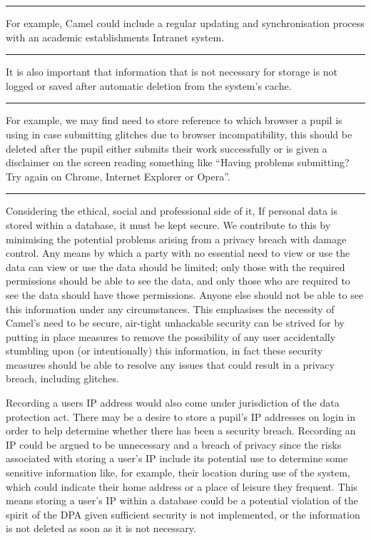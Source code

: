 	\vspace{0.35cm}
    \hrule
    {\raggedleft \scriptsize For example, Camel could include a regular updating and synchronisation process with an academic establishments Intranet system. \par}
    \vspace{0.35cm}
    \hrule

    It is also important that information that is not necessary for storage is not logged or saved after automatic deletion from the system’s cache.

	\vspace{0.35cm}
    \hrule
    {\raggedleft \scriptsize  For example, we may find need to store reference to which browser a pupil is using in case submitting glitches due to  browser incompatibility, this should be deleted after the pupil either submits their work successfully or is given a disclaimer on the screen reading something like “Having problems submitting? Try again on Chrome, Internet Explorer or Opera”.\par}
    \vspace{0.35cm}
    \hrule

    Considering the ethical, social and professional side of it, If personal data is stored within a database, it must be kept secure. We contribute to this by minimising the potential problems arising from a privacy breach with damage control. Any means by which a party with no essential need to view or use the data can view or use the data should be limited; only those with the required permissions should be able to see the data, and only those who are required to see the data should have those permissions. Anyone else should not be able to see this information under any circumstances. This emphasises the necessity of Camel’s need to be secure, air-tight unhackable security can be strived for by putting in place measures to remove the possibility of any user accidentally stumbling upon (or intentionally) this information, in fact these security measures should be able to resolve any issues that could result in a privacy breach, including glitches.

    Recording a users IP address would also come under jurisdiction of the data protection act. There may be a desire to store a pupil's IP addresses on login in order to help determine whether there has been a security breach. Recording an IP could be argued to be unnecessary and a breach of privacy since the risks associated with storing a user’s IP include its potential use to determine some sensitive information like, for example, their location during use of the system, which could indicate their home address or a place of leisure they frequent. This means storing a user’s IP within a database could be a potential violation of the spirit of the DPA given sufficient security is not implemented, or the information is not deleted as soon as it is not necessary.

